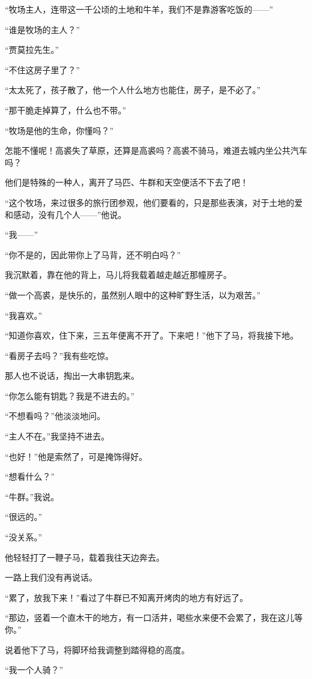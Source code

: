\par “牧场主人，连带这一千公顷的土地和牛羊，我们不是靠游客吃饭的——”
\par “谁是牧场的主人？”
\par “贾莫拉先生。”
\par “不住这房子里了？”
\par “太太死了，孩子散了，他一个人什么地方也能住，房子，是不必了。”
\par “那干脆走掉算了，什么也不带。”
\par “牧场是他的生命，你懂吗？”
\par 怎能不懂呢！高裘失了草原，还算是高裘吗？高裘不骑马，难道去城内坐公共汽车吗？
\par 他们是特殊的一种人，离开了马匹、牛群和天空便活不下去了吧！
\par “这个牧场，来过很多的旅行团参观，他们要看的，只是那些表演，对于土地的爱和感动，没有几个人——”他说。
\par “我——”
\par “你不是的，因此带你上了马背，还不明白吗？”
\par 我沉默着，靠在他的背上，马儿将我载着越走越近那幢房子。
\par “做一个高裘，是快乐的，虽然别人眼中的这种旷野生活，以为艰苦。”
\par “我喜欢。”
\par “知道你喜欢，住下来，三五年便离不开了。下来吧！”他下了马，将我接下地。
\par “看房子去吗？”我有些吃惊。
\par 那人也不说话，掏出一大串钥匙来。
\par “你怎么能有钥匙？我是不进去的。”
\par “不想看吗？”他淡淡地问。
\par “主人不在。”我坚持不进去。
\par “也好！”他是索然了，可是掩饰得好。
\par “想看什么？”
\par “牛群。”我说。
\par “很远的。”
\par “没关系。”
\par 他轻轻打了一鞭子马，载着我往天边奔去。
\par 一路上我们没有再说话。
\par “累了，放我下来！”看过了牛群已不知离开烤肉的地方有好远了。
\par “那边，竖着一个直木干的地方，有一口活井，喝些水来便不会累了，我在这儿等你。”
\par 说着他下了马，将脚环给我调整到踏得稳的高度。
\par “我一个人骑？”
